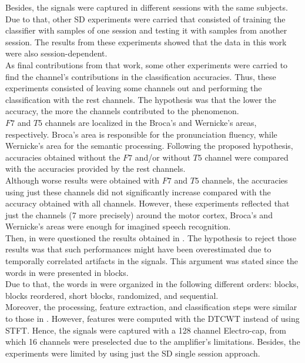 Besides, the signals were captured in different sessions with the same subjects. Due to that, other SD experiments were carried that consisted of training the classifier with samples of one session and testing it with samples from another session. The results from these experiments showed that the data in this work were also session-dependent.\\

As final contributions from that work, some other experiments were carried to find the channel's contributions in the classification accuracies. Thus, these experiments consisted of leaving some channels out and performing the classification with the rest channels. The hypothesis was that the lower the accuracy, the more the channels contributed to the phenomenon.\\

$F7$ and $T5$ channels are localized in the Broca's and Wernicke's areas, respectively. Broca's area is responsible for the pronunciation fluency, while Wernicke's area for the semantic processing. Following the proposed hypothesis, accuracies obtained without the $F7$  and/or without $T5$ channel were compared with the accuracies provided by the rest channels.\\

Although worse results were obtained with $F7$ and $T5$ channels, the accuracies using just these channels did not significantly increase compared with the accuracy obtained with all channels. However, these experiments reflected that just the channels (7 more precisely) around the motor cortex, Broca's and Wernicke's areas were enough for imagined speech recognition.\\

Then, in \cite{porbadnigk2009eeg} were questioned the results obtained in \cite{marek}. The hypothesis to reject those results was that such performances might have been overestimated due to temporally correlated artifacts in the signals. This argument was stated since the words in \cite{marek} were presented in blocks.\\

Due to that, the words in \cite{porbadnigk2009eeg} were organized in the following different orders: blocks, blocks reordered, short blocks, randomized, and sequential.\\

Moreover, the processing, feature extraction, and classification steps were similar to those in \cite{marek}. However, features were computed with the DTCWT instead of using STFT. Hence, the signals were captured with a 128 channel Electro-cap, from which 16 channels were preselected due to the amplifier's limitations. Besides, the experiments were limited by using just the SD single session approach.\\

